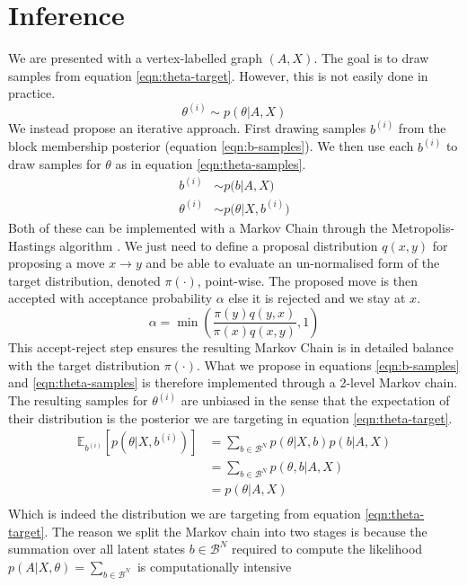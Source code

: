 \documentclass{article}
\newcommand{\Bcal}{\mathcal{B}}
\newcommand{\Expect}{\mathbb{E}}
\begin{document}
\section{Inference}

We are presented with a vertex-labelled graph $(A, X)$. The goal is to draw samples from equation \ref{eqn:theta-target}. However, this is not easily done in practice.
%
\begin{equation}
	\label{eqn:theta-target}
	\theta^{(i)} \sim p(\theta | A, X)
\end{equation}
%
We instead propose an iterative approach. First drawing samples $b^{(i)}$ from the block membership posterior (equation \ref{eqn:b-samples}). We then use each $b^{(i)}$ to draw samples for $\theta$ as in equation \ref{eqn:theta-samples}. 
%
\begin{align}
	b^{(i)} &\sim p \Big( b | A, X \Big)  \label{eqn:b-samples}\\
	\theta^{(i)} &\sim p\Big(\theta | X, b^{(i)} \Big) \label{eqn:theta-samples}
\end{align}
%
Both of these can be implemented with a Markov Chain through the Metropolis-Hastings algorithm \cite{hastings-alg}. We just need to define a proposal distribution $q(x, y)$ for proposing a move $x \rightarrow y$ and be able to evaluate an un-normalised form of the target distribution, denoted $\pi(\cdot)$, point-wise. The proposed move is then accepted with acceptance probability $\alpha$ else it is rejected and we stay at $x$.
%
\begin{equation}
	\alpha = \min \left( \frac{\pi(y) q(y, x)}{\pi(x) q(x, y)} , 1 \right)
\end{equation}
%
This accept-reject step ensures the resulting Markov Chain is in detailed balance with the target distribution $\pi(\cdot)$. What we propose in equations \ref{eqn:b-samples} and \ref{eqn:theta-samples} is therefore implemented through a 2-level Markov chain. The resulting samples for $\theta^{(i)}$ are unbiased in the sense that the expectation of their distribution is the posterior we are targeting in equation \ref{eqn:theta-target}.
%
\begin{align*}
	\Expect_{b^{(i)}} \left[p \left( \theta | X, b^{(i)} \right) \right] &= \sum_{b \in \mathcal{B}^N} p(\theta | X, b) p(b | A, X) \\
	&= \sum_{b \in \mathcal{B}^N} p(\theta, b | A, X) \\
	&= p(\theta | A, X) \\
\end{align*}
%
Which is indeed the distribution we are targeting from equation \ref{eqn:theta-target}. The reason we split the Markov chain into two stages is because the summation over all latent states $b \in \mathcal{B}^N$ required to compute the likelihood $p(A| X, \theta) = \sum_{b \in \Bcal^N}$ is computationally intensive
\end{document}
